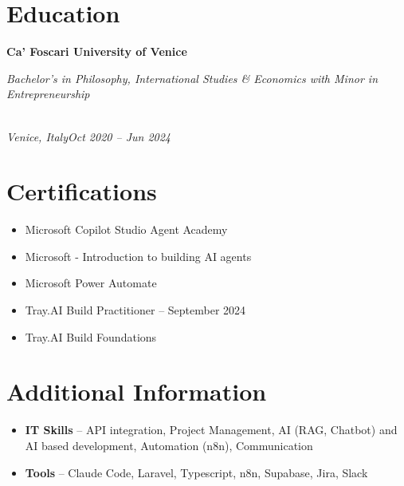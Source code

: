 \documentclass[a4paper,10pt]{article}
\newcommand{\role}[4]{\vspace{3pt}\noindent\hspace{0.6em}\parbox[t]{0.38\textwidth}{\raggedright\textbf{#1}}\hfill\parbox[t]{0.58\textwidth}{\raggedleft\textit{#2}}\\{\textit{#3}\hfill\textit{#4}}\vspace{1pt}}
\begin{document}
\section{Education}
\role{Ca' Foscari University of Venice}{Bachelor's in Philosophy, International Studies \& Economics with Minor in Entrepreneurship}{Venice, Italy}{Oct 2020 -- Jun 2024}

\section{Certifications}
\begin{itemize}
\item Microsoft Copilot Studio Agent Academy
\item Microsoft - Introduction to building AI agents
\item Microsoft Power Automate
\item Tray.AI Build Practitioner -- September 2024
\item Tray.AI Build Foundations
\end{itemize}

\section{Additional Information}
\begin{itemize}
\item \textbf{IT Skills} -- API integration, Project Management, AI (RAG, Chatbot) and AI based development, Automation (n8n), Communication
\item \textbf{Tools} -- Claude Code, Laravel, Typescript, n8n, Supabase, Jira, Slack
\end{itemize}
\end{document}
